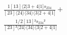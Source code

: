 \documentclass[varwidth, border=5pt]{standalone}
\begin{document}
\begin{my}
$\begin{gathered}
\scriptscriptstyle\frac{1[13]⟨2|3+4|1]s_{234}}{[23]⟨24⟩⟨34⟩⟨3|2+4|1]} +\\
\scriptscriptstyle\frac{1/2[13]²s_{234}²}{[23]²⟨24⟩⟨34⟩⟨3|2+4|1]} \phantom{+}
\end{gathered}$
\end{my}
\end{document}
